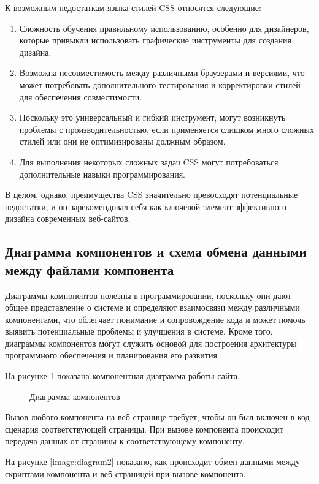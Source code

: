 К возможным недостаткам языка стилей CSS относятся следующие:
\begin{enumerate}
	\item Сложность обучения правильному использованию, особенно для дизайнеров, которые привыкли использовать графические инструменты для создания дизайна.
	\item Возможна несовместимость между различными браузерами и версиями, что может потребовать дополнительного тестирования и корректировки стилей для обеспечения совместимости.
	\item Поскольку это универсальный и гибкий инструмент, могут возникнуть проблемы с производительностью, если применяется слишком много сложных стилей или они не оптимизированы должным образом.
	\item Для выполнения некоторых сложных задач CSS могут потребоваться дополнительные навыки программирования.
\end{enumerate}

В целом, однако, преимущества CSS значительно превосходят потенциальные недостатки, и он зарекомендовал себя как ключевой элемент эффективного дизайна современных веб-сайтов.

\subsection{Диаграмма компонентов и схема обмена данными между файлами компонента}

Диаграммы компонентов полезны в программировании, поскольку они дают общее представление о системе и определяют взаимосвязи между различными компонентами, что облегчает понимание и сопровождение кода и может помочь выявить потенциальные проблемы и улучшения в системе. Кроме того, диаграммы компонентов могут служить основой для построения архитектуры программного обеспечения и планирования его развития.

На рисунке \ref{image:diagram} показана компонентная диаграмма работы сайта.

\begin{figure}
\caption{Диаграмма компонентов}
\label{image:diagram}
\end{figure}

Вызов любого компонента на веб-странице требует, чтобы он был включен в код сценария соответствующей страницы. При вызове компонента происходит передача данных от страницы к соответствующему компоненту.

На рисунке \ref{image:diagram2} показано, как происходит обмен данными между скриптами компонента и веб-страницей при вызове компонента.

